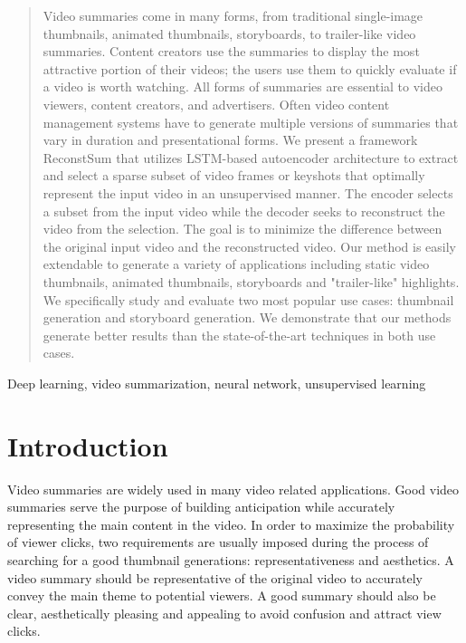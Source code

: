 \documentclass[5pt]{article}
\begin{document}
%
\begin{abstract}
Video summaries come in many forms, from traditional single-image thumbnails, animated thumbnails, storyboards, to trailer-like video summaries. Content creators use the summaries to display the most attractive portion of their videos; the users use them to quickly evaluate if a video is worth watching. All forms of summaries are essential to video viewers, content creators, and advertisers. Often video content management systems have to generate multiple versions of summaries that vary in duration and presentational forms. We present a framework ReconstSum that utilizes LSTM-based autoencoder architecture to extract and select a sparse subset of video frames or keyshots that optimally represent the input video in an unsupervised manner. The encoder selects a subset from the input video while the decoder seeks to reconstruct the video from the selection. The goal is to minimize the difference between the original input video and the reconstructed video. Our method is easily extendable to generate a variety of applications including static video thumbnails, animated thumbnails, storyboards and "trailer-like" highlights. We specifically study and evaluate two most popular use cases: thumbnail generation and storyboard generation. We demonstrate that our methods generate better results than the state-of-the-art techniques in both use cases.
\end{abstract}
%
\begin{keywords}
Deep learning, video summarization, neural network, unsupervised learning
\end{keywords}
%
\section{Introduction}
\label{sec:intro}
Video summaries are widely used in many video related applications. Good video summaries serve the purpose of building anticipation while accurately representing the main content in the video. In order to maximize the probability of viewer clicks, two requirements are usually imposed during the process of searching for a good thumbnail generations: representativeness and aesthetics. A video summary should be representative of the original video to accurately convey the main theme to potential viewers. A good summary should also be clear, aesthetically pleasing and appealing to avoid confusion and attract view clicks. 
\end{document}
